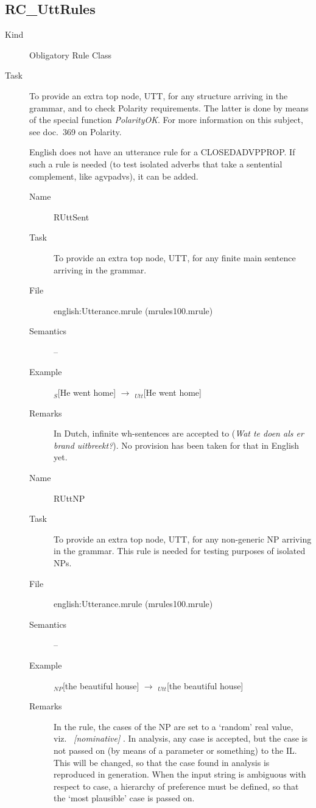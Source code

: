 \subsection{RC\_UttRules}
\begin{description}
\item[Kind] Obligatory Rule Class
\item[Task] To provide an extra top node, UTT, for any structure arriving 
in the grammar, and to check Polarity requirements. The latter is done by 
means of the special function {\em PolarityOK\/}. For more information on this 
subject, see doc.\ 369 on Polarity.

English does not have an utterance rule for a CLOSEDADVPPROP. If such a rule is 
needed (to test isolated adverbs that take a sentential complement, like 
agvpadvs), it can be added.

\vspace{1 cm}
\begin{description}
\item[Name] RUttSent
\item[Task] To provide an extra top node, UTT, for any finite main sentence 
arriving in the grammar.
\item[File] english:Utterance.mrule (mrules100.mrule)
\item[Semantics] --
\item[Example] $_{S}$[He went home] $\rightarrow$ $_{Utt}$[He went home]
\item[Remarks] In Dutch, infinite wh-sentences are accepted to ({\em Wat te 
doen als er brand uitbreekt?\/}). No provision has been taken for that in 
English yet.
\end{description}

\vspace{1 cm}
\begin{description}
\item[Name] RUttNP
\item[Task] To provide an extra top node, UTT, for any non-generic NP
arriving in the grammar. This rule is needed for testing purposes of isolated 
NPs.
\item[File] english:Utterance.mrule (mrules100.mrule)
\item[Semantics] --
\item[Example] $_{NP}$[the beautiful house] $\rightarrow$ $_{Utt}$[the beautiful 
house]
\item[Remarks] In the rule, the cases of the NP are set to a `random' real 
value, viz.\ {\em 
[nominative] \/}. In analysis, any case is accepted, but the case is not passed 
on (by means of a parameter or something) to the IL. This will be changed, so 
that the case found in analysis is reproduced in generation. When the input 
string is ambiguous with respect to case, a hierarchy of preference must be 
defined, so that the `most plausible' case is passed on.


\end{description}
\end{description}
